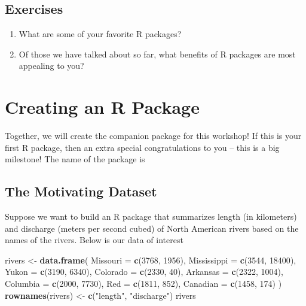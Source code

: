 \documentclass[
]{book}
\newenvironment{Shaded}{\begin{snugshade}}{\end{snugshade}}
\newcommand{\DataTypeTok}[1]{\textcolor[rgb]{0.13,0.29,0.53}{#1}}
\newcommand{\DecValTok}[1]{\textcolor[rgb]{0.00,0.00,0.81}{#1}}
\newcommand{\KeywordTok}[1]{\textcolor[rgb]{0.13,0.29,0.53}{\textbf{#1}}}
\newcommand{\NormalTok}[1]{#1}
\newcommand{\StringTok}[1]{\textcolor[rgb]{0.31,0.60,0.02}{#1}}
\begin{document}
\hypertarget{exercises}{%
\subsection{Exercises}\label{exercises}}

\begin{enumerate}
\def\labelenumi{\arabic{enumi}.}
\item
  What are some of your favorite R packages?
\item
  Of those we have talked about so far, what benefits of R packages are most appealing to you?
\end{enumerate}

\hypertarget{creating-an-r-package}{%
\section{Creating an R Package}\label{creating-an-r-package}}

Together, we will create the companion package for this workshop! If this is your first R package, then an extra special congratulations to you -- this is a big milestone! The name of the package is

\hypertarget{the-motivating-dataset}{%
\subsection{The Motivating Dataset}\label{the-motivating-dataset}}

Suppose we want to build an R package that summarizes length (in kilometers) and discharge (meters per second cubed) of North American rivers based on the names of the rivers. Below is our data of interest

\begin{Shaded}
\begin{Highlighting}[]
\NormalTok{rivers <-}\StringTok{ }\KeywordTok{data.frame}\NormalTok{(}
  \DataTypeTok{Missouri =} \KeywordTok{c}\NormalTok{(}\DecValTok{3768}\NormalTok{, }\DecValTok{1956}\NormalTok{),}
  \DataTypeTok{Mississippi =} \KeywordTok{c}\NormalTok{(}\DecValTok{3544}\NormalTok{, }\DecValTok{18400}\NormalTok{),}
  \DataTypeTok{Yukon =} \KeywordTok{c}\NormalTok{(}\DecValTok{3190}\NormalTok{, }\DecValTok{6340}\NormalTok{),}
  \DataTypeTok{Colorado =} \KeywordTok{c}\NormalTok{(}\DecValTok{2330}\NormalTok{, }\DecValTok{40}\NormalTok{),}
  \DataTypeTok{Arkansas =} \KeywordTok{c}\NormalTok{(}\DecValTok{2322}\NormalTok{, }\DecValTok{1004}\NormalTok{),}
  \DataTypeTok{Columbia =} \KeywordTok{c}\NormalTok{(}\DecValTok{2000}\NormalTok{, }\DecValTok{7730}\NormalTok{),}
  \DataTypeTok{Red =} \KeywordTok{c}\NormalTok{(}\DecValTok{1811}\NormalTok{, }\DecValTok{852}\NormalTok{),}
  \DataTypeTok{Canadian =} \KeywordTok{c}\NormalTok{(}\DecValTok{1458}\NormalTok{, }\DecValTok{174}\NormalTok{)}
\NormalTok{) }
\KeywordTok{rownames}\NormalTok{(rivers) <-}\StringTok{ }\KeywordTok{c}\NormalTok{(}\StringTok{"length"}\NormalTok{, }\StringTok{"discharge"}\NormalTok{)}
\NormalTok{rivers}
\end{Highlighting}
\end{Shaded}
\end{document}
